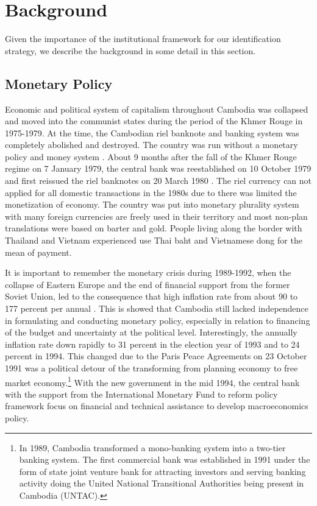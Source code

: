 \documentclass[11pt,letterpaper]{article}
\begin{document}
\clearpage
\section{Background}\label{sec:back}
Given the importance of the institutional framework for our identification strategy, we describe the background in some detail in this section.
\subsection{Monetary Policy}
Economic and political system of capitalism throughout Cambodia was collapsed and moved into the communist states during the period of the Khmer Rouge in 1975-1979. At the time, the Cambodian riel banknote and banking system was completely abolished and destroyed. The country was run without a monetary policy and money system \cite{Duma2014}. About 9 months after the fall of the Khmer Rouge regime on 7 January 1979, the central bank was reestablished on 10 October 1979 and first reissued the riel banknotes on 20 March 1980 \cite{Visoth2010}. The riel currency can not applied for all domestic transactions in the 1980s due to there was limited the monetization of economy. The country was put into monetary plurality system with many foreign currencies are freely used in their territory and most non-plan translations were based on barter and gold. People living along the border with Thailand and Vietnam experienced use Thai baht and Vietnamese dong for the mean of payment. 

It is important to remember the monetary crisis during 1989-1992, when the collapse of Eastern Europe and the end of financial support from the former Soviet Union, led to the consequence that high inflation rate from about 90 to 177 percent per annual \cite{Chhun2005}. This is showed that Cambodia still lacked independence in formulating and conducting monetary policy, especially in relation to financing of the budget and uncertainty at the political level. Interestingly, the annually inflation rate down rapidly to 31 percent in the election year of 1993 and to 24 percent in 1994. This changed due to the Paris Peace Agreements on 23 October 1991 was a political detour of the transforming from planning economy to free market economy.\footnote{In 1989, Cambodia transformed a mono-banking system into a two-tier banking system. The first commercial bank was established in 1991 under the form of state joint venture bank for attracting investors and serving banking activity doing the United National Transitional Authorities being present in Cambodia (UNTAC).} With the new government in the mid 1994, the central bank with the support from the International Monetary Fund to reform policy framework focus on financial and technical assistance to develop macroeconomics policy.
\end{document}
